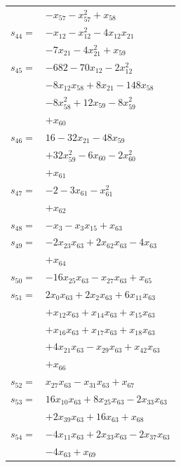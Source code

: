 \begin{longtable}{@{}r@{\;}l@{}}
 & \(\displaystyle -x_{57} -x_{57}^{2} +x_{58}\) \\[3pt]
\(s_{44}=\) & \(\displaystyle -x_{12} -x_{12}^{2} -4x_{12}x_{21}\) \\
 & \(\displaystyle -7x_{21} -4x_{21}^{2} +x_{59}\) \\[3pt]
\(s_{45}=\) & \(\displaystyle -682 -70x_{12} -2x_{12}^{2}\) \\
 & \(\displaystyle -8x_{12}x_{58} +8x_{21} -148x_{58}\) \\
 & \(\displaystyle -8x_{58}^{2} +12x_{59} -8x_{59}^{2}\) \\
 & \(\displaystyle +x_{60}\) \\[3pt]
\(s_{46}=\) & \(\displaystyle 16 -32x_{21} -48x_{59}\) \\
 & \(\displaystyle +32x_{59}^{2} -6x_{60} -2x_{60}^{2}\) \\
 & \(\displaystyle +x_{61}\) \\[3pt]
\(s_{47}=\) & \(\displaystyle -2 -3x_{61} -x_{61}^{2}\) \\
 & \(\displaystyle +x_{62}\) \\[3pt]
\(s_{48}=\) & \(\displaystyle -x_{3} -x_{3}x_{15} +x_{63}\) \\[3pt]
\(s_{49}=\) & \(\displaystyle -2x_{23}x_{63} +2x_{62}x_{63} -4x_{63}\) \\
 & \(\displaystyle +x_{64}\) \\[3pt]
\(s_{50}=\) & \(\displaystyle -16x_{25}x_{63} -x_{27}x_{63} +x_{65}\) \\[3pt]
\(s_{51}=\) & \(\displaystyle 2x_{0}x_{63} +2x_{2}x_{63} +6x_{11}x_{63}\) \\
 & \(\displaystyle +x_{12}x_{63} +x_{14}x_{63} +x_{15}x_{63}\) \\
 & \(\displaystyle +x_{16}x_{63} +x_{17}x_{63} +x_{18}x_{63}\) \\
 & \(\displaystyle +4x_{21}x_{63} -x_{29}x_{63} +x_{42}x_{63}\) \\
 & \(\displaystyle +x_{66}\) \\[3pt]
\(s_{52}=\) & \(\displaystyle x_{27}x_{63} -x_{31}x_{63} +x_{67}\) \\[3pt]
\(s_{53}=\) & \(\displaystyle 16x_{10}x_{63} +8x_{25}x_{63} -2x_{33}x_{63}\) \\
 & \(\displaystyle +2x_{39}x_{63} +16x_{63} +x_{68}\) \\[3pt]
\(s_{54}=\) & \(\displaystyle -4x_{11}x_{63} +2x_{33}x_{63} -2x_{37}x_{63}\) \\
 & \(\displaystyle -4x_{63} +x_{69}\) \\[3pt]

\end{longtable}
